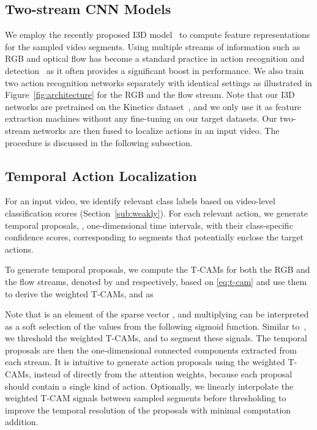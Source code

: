 \documentclass[10pt,twocolumn,letterpaper]{article}
\begin{document}
\subsection{Two-stream CNN Models} 
\label{sub:two-stream}
We employ the recently proposed I3D model~\cite{carreira17quo} to compute feature representations for the sampled video segments.
Using multiple streams of information such as RGB and optical flow has become a standard practice in action recognition and detection~\cite{carreira17quo,feichtenhofer16convolutional,simonyan14two} as it often provides a significant boost in performance.
We also train two action recognition networks separately with identical settings as illustrated in Figure~\ref{fig:architecture} for the RGB and the flow stream.
Note that our I3D networks are pretrained on the Kinetics dataset~\cite{kay2017kinetics}, and we only use it as feature extraction machines without any fine-tuning on our target datasets.
Our two-stream networks are then fused to localize actions in an input video.
The procedure is discussed in the following subsection.

\subsection{Temporal Action Localization}
\label{sub:temporal}
For an input video, we identify relevant class labels based on video-level classification scores (Section~\ref{sub:weakly}).
For each relevant action, we generate temporal proposals, \ie, one-dimensional time intervals, with their class-specific confidence scores, corresponding to segments that potentially enclose the target actions.


To generate temporal proposals, we compute the T-CAMs for both the RGB and the flow streams, denoted by  and  respectively, based on \eqref{eq:t-cam} and use them to derive the weighted T-CAMs,  and  as

Note that  is an element of the sparse vector , and multiplying  can be interpreted as a soft selection of the values from the following sigmoid function.
Similar to~\cite{zhou16learning}, we threshold the weighted T-CAMs,  and  to segment these signals. The temporal proposals are then the one-dimensional connected components extracted from each stream.
It is intuitive to generate action proposals using the weighted T-CAMs, instead of directly from the attention weights, because each proposal should contain a single kind of action.
Optionally, we linearly interpolate the weighted T-CAM signals between sampled segments before thresholding to improve the temporal resolution of the proposals with minimal computation addition.
\end{document}
